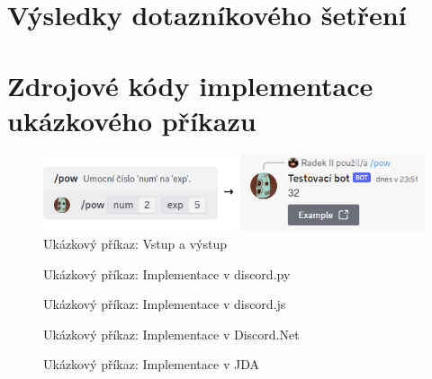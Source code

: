 \documentclass[FM]{tulthesis}
\begin{document}
	\section{Výsledky dotazníkového šetření}
	
	\section{Zdrojové kódy implementace ukázkového příkazu}\label{Appendix3}
	
	\begin{figure}[ht]
		\centering
		\includegraphics[width=\textwidth]{img/ExampleCommand}
		\caption{Ukázkový příkaz: Vstup a výstup}
	\end{figure}
	
	\begin{figure}[ht]
		
		\caption{Ukázkový příkaz: Implementace v discord.py}
	\end{figure}
	
	\begin{figure}[ht]
		
		\caption{Ukázkový příkaz: Implementace v discord.js}
	\end{figure}
	
	\begin{figure}[ht]
		
		\caption{Ukázkový příkaz: Implementace v Discord.Net}
	\end{figure}
	
	\begin{figure}[ht]
		
		\caption{Ukázkový příkaz: Implementace v JDA}
	\end{figure}
	
\end{document}

